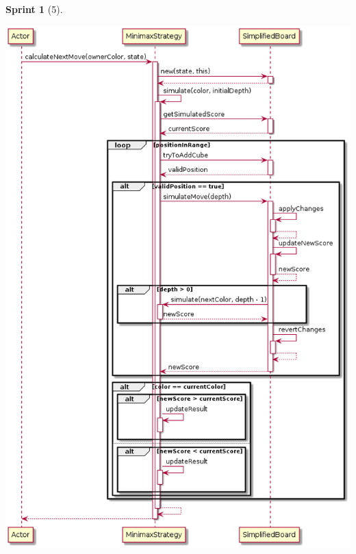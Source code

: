 \documentclass{article}
\theoremstyle{break}
\newtheorem*{sprint}{Sprint}
\begin{document}
\begin{sprint}[5]
\begin{center}
\centering
\includegraphics[scale=0.5]{Minimax.calculateNextMove()-Sprint5.png}
\end{center}

\end{sprint}
\end{document}
